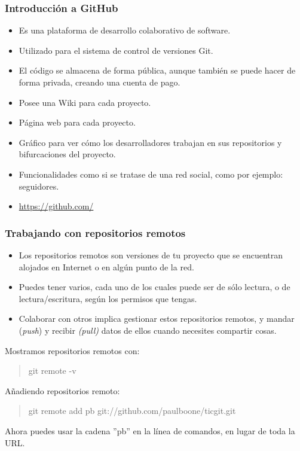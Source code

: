 \documentclass{beamer}
\begin{document}
\begin{frame}
\frametitle{Introducción a GitHub}
\begin{itemize}[<+->]
\item Es una plataforma de desarrollo colaborativo de software. 
\item Utilizado para el sistema de control de versiones Git. 
\item El código se almacena de forma pública, aunque también se puede hacer de forma privada, creando una cuenta de pago.
\item Posee una Wiki para cada proyecto.
\item Página web para cada proyecto.
\item Gráfico para ver cómo los desarrolladores trabajan en sus repositorios y bifurcaciones del proyecto.
\item Funcionalidades como si se tratase de una red social, como por ejemplo: seguidores.
\item \url{https://github.com/}
\end{itemize}
\end{frame}



\begin{frame}
\frametitle{Trabajando con repositorios remotos}
\begin{itemize}[<+->]
\item Los repositorios remotos son versiones de tu proyecto que se encuentran alojados en Internet o en algún punto de la red.
\item Puedes tener varios, cada uno de los cuales puede ser de sólo lectura, o de lectura/escritura, según los permisos que tengas.
\item Colaborar con otros implica gestionar estos repositorios remotos, y mandar (\emph{push}) y recibir \emph{(pull)} datos de ellos cuando necesites compartir cosas. 
\end{itemize}
\pause
Mostramos repositorios remotos con:
\begin{verse}
git remote -v
\end{verse}
\pause
Añadiendo repositorios remoto:
\begin{verse}
git remote add pb git://github.com/paulboone/ticgit.git
\end{verse}
\pause
Ahora puedes usar la cadena ''pb'' en la línea de comandos, en lugar de toda la URL. 
\end{frame}
\end{document}
